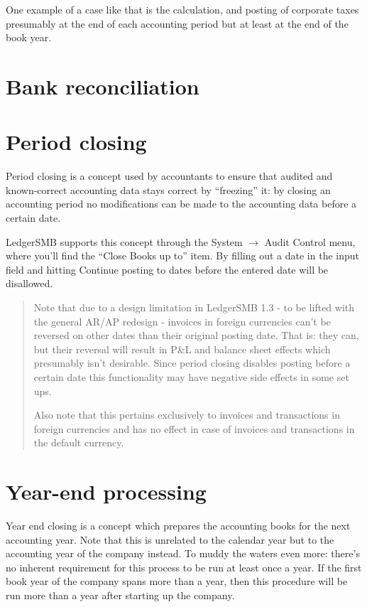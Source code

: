 One example of a case like that is the calculation, and posting of
corporate taxes presumably at the end of each accounting period but at least
at the end of the book year.



\section{Bank reconciliation}
\label{sec:Reconciliation}



\section{Period closing}

Period closing is a concept used by accountants to ensure that audited and
known-correct accounting data stays correct by ``freezing'' it: by closing
an accounting period no modifications can be made to the accounting data
before a certain date.

LedgerSMB supports this concept through the System $\rightarrow$ Audit Control
menu, where you'll find the ``Close Books up to'' item. By filling out a date
in the input field and hitting Continue posting to dates before the entered
date will be disallowed.


\begin{quotation}
Note that due to a design limitation in LedgerSMB 1.3 - to be lifted with the
general AR/AP redesign - invoices in foreign currencies can't be reversed on
other dates than their original posting date. That is: they can, but their
reversal will result in P\&L and balance sheet effects which presumably isn't
desirable. Since period closing disables posting before a certain date this
functionality may have negative side effects in some set ups.

Also note that this pertains exclusively to invoices and transactions in foreign
currencies and has no effect in case of invoices and transactions in the default
currency.
\end{quotation}

\section{Year-end processing}
\label{sec:YearEndProcessing}

Year end closing is a concept which prepares the accounting books for the next
accounting year. Note that this is unrelated to the calendar year but to the
accounting year of the company instead. To muddy the waters even more: there's
no inherent requirement for this process to be run at least once a year. If the
first book year of the company spans more than a year, then this procedure will
be run more than a year after starting up the company.

